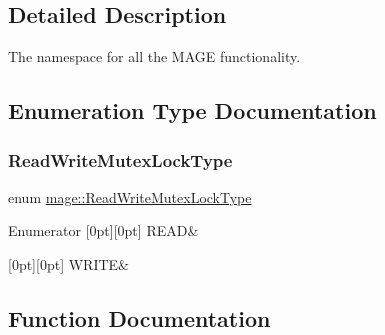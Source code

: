 \subsection{Detailed Description}
The namespace for all the M\+A\+GE functionality. 

\subsection{Enumeration Type Documentation}
\hypertarget{namespacemage_afd76fcca37ce5c5b2227671290973c74}{}\label{namespacemage_afd76fcca37ce5c5b2227671290973c74} 
\subsubsection{\texorpdfstring{Read\+Write\+Mutex\+Lock\+Type}{ReadWriteMutexLockType}}
{\footnotesize\ttfamily enum \hyperlink{namespacemage_afd76fcca37ce5c5b2227671290973c74}{mage\+::\+Read\+Write\+Mutex\+Lock\+Type}}

\begin{DoxyEnumFields}{Enumerator}
[0pt][0pt]{}\hypertarget{namespacemage_afd76fcca37ce5c5b2227671290973c74a384918b13691984406aeb754f1c454d0}{}\label{namespacemage_afd76fcca37ce5c5b2227671290973c74a384918b13691984406aeb754f1c454d0} 
R\+E\+AD&\\
\hline

[0pt][0pt]{}\hypertarget{namespacemage_afd76fcca37ce5c5b2227671290973c74aff9d196f4bda4079f3f1ce90bd644662}{}\label{namespacemage_afd76fcca37ce5c5b2227671290973c74aff9d196f4bda4079f3f1ce90bd644662} 
W\+R\+I\+TE&\\
\hline

\end{DoxyEnumFields}


\subsection{Function Documentation}
\hypertarget{namespacemage_a7d706913bb9fb322c938cd3e4d8eaede}{}\label{namespacemage_a7d706913bb9fb322c938cd3e4d8eaede} 
